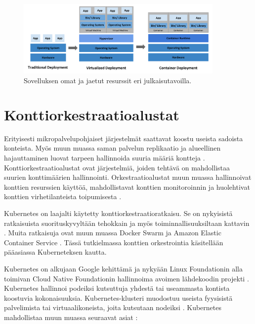\begin{figure}[ht]
\begin{center}
\includegraphics[width=0.9\textwidth]{figures/container_evolution.png}
\caption{Sovelluksen omat ja jaetut resurssit eri julkaisutavoilla.\cite{Kubernetes23}\label{fig:container}}
\end{center}
\end{figure}

\section{Konttiorkestraatioalustat}

Erityisesti mikropalvelupohjaiset järjestelmät saattavat koostu useista sadoista konteista.
Myös muun muassa saman palvelun replikaatio ja alueellinen hajauttaminen luovat tarpeen hallinnoida suuria määriä kontteja \cite{Khan17}.
Konttiorkestraatioalustat ovat järjestelmiä, joiden tehtävä on mahdollistaa suurien konttimäärien hallinnointi.
Orkestraatioalustat muun muassa hallinnoivat konttien resurssien käyttöä, mahdollistavat konttien monitoroinnin ja huolehtivat konttien virhetilanteista toipumisesta \cite{Zhou21}.

Kubernetes on laajalti käytetty konttiorkestraatioratkaisu.
Se on nykyisistä ratkaisuista suorituskyvyltään tehokkain ja myös toiminnallisuuksiltaan kattavin \cite{Jawarneh19}.
Muita ratkaisuja ovat muun muassa Docker Swarm ja Amazon Elastic Container Service \cite{Khan17}.
Tässä tutkielmassa konttien orkestrointia käsitellään pääasiassa Kuberneteksen kautta.

Kubernetes on alkujaan Google kehittämä ja nykyään Linux Foundationin alla toimivan Cloud Native Foundationin hallinnoima avoimen lähdekoodin projekti \cite{Burns22}.
Kubernetes hallinnoi podeiksi kutsuttuja yhdestä tai useammasta kontista koostuvia kokonaisuuksia.
Kubernetes-klusteri muodostuu useista fyysisistä palvelimista tai virtuaalikoneista, joita kutsutaan nodeiksi \cite{Medel18}.
Kubernetes mahdollistaa muun muassa seuraavat asiat \cite{Zhou21}:


